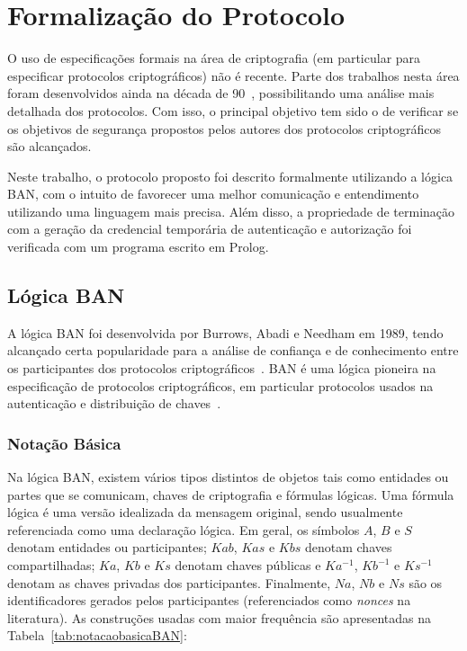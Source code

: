 \section{Formalização do Protocolo}

O uso de especificações formais na área de criptografia (em particular para especificar protocolos criptográficos)
não é recente. Parte dos trabalhos nesta área foram desenvolvidos ainda na década de 90~\cite{Meadows95}, possibilitando uma análise mais detalhada dos protocolos. Com isso, o principal objetivo tem sido o de verificar se os objetivos de segurança propostos pelos autores dos protocolos criptográficos são alcançados.

Neste trabalho, o protocolo proposto foi descrito formalmente utilizando a lógica BAN, com o intuito de favorecer uma melhor comunicação e entendimento utilizando uma linguagem mais precisa. Além disso, a propriedade de terminação com a geração da credencial temporária de autenticação e autorização foi verificada com um programa escrito em Prolog.

\subsection{Lógica BAN}

A lógica BAN foi desenvolvida por Burrows, Abadi e Needham em 1989, tendo alcançado certa popularidade para a análise de confiança e de conhecimento entre os participantes dos protocolos criptográficos~\cite{Burrows1990}. BAN é uma lógica pioneira na especificação de protocolos criptográficos, em particular protocolos usados na autenticação e
distribuição de chaves~\cite{Burrows1990}.

\subsubsection{Notação Básica}

Na lógica BAN, existem vários tipos distintos de objetos tais como entidades ou partes que se comunicam, chaves de criptografia e fórmulas lógicas. Uma fórmula lógica é uma versão idealizada da mensagem original, sendo usualmente referenciada como uma declaração lógica. Em geral, os símbolos $A$, $B$ e $S$ denotam entidades ou participantes; $Kab$, $Kas$ e $Kbs$ denotam chaves compartilhadas; $Ka$, $Kb$ e $Ks$ denotam chaves públicas e $Ka^{-1}$, $Kb^{-1}$ e $Ks^{-1}$ denotam as chaves privadas dos participantes.
Finalmente, $Na$, $Nb$ e $Ns$ são os identificadores gerados pelos participantes (referenciados como \emph{nonces}
na literatura). As construções usadas com maior frequência são apresentadas na Tabela~\ref{tab:notacaobasicaBAN}:

